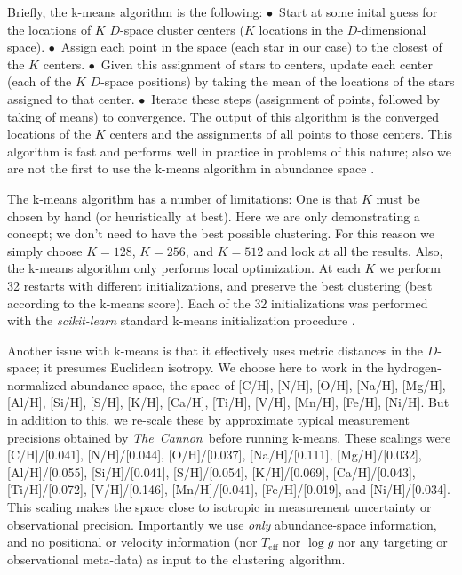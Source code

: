 \documentclass[12pt, letterpaper, preprint]{aastex}
\newcommand{\project}[1]{\textsl{#1}}
\newcommand{\thecannon}{\project{The~Cannon}}
\newcommand{\teff}{T_{\mathrm{eff}}}
\newcommand{\logg}{\log g}
\begin{document}
Briefly, the k-means algorithm is the following:
$\bullet$~Start at some inital guess for the locations of $K$ $D$-space cluster centers ($K$
locations in the $D$-dimensional space).
$\bullet$~Assign each point in the
space (each star in our case) to the closest of the $K$ centers.
$\bullet$~Given this assignment of stars to centers, update each center (each of
the $K$ $D$-space positions) by taking the mean of the locations of
the stars assigned to that center.
$\bullet$~Iterate these steps (assignment of points, followed by taking of means) to convergence.
The output of this algorithm is the converged locations of the $K$ centers and the assignments of
all points to those centers.
This algorithm is fast and performs well in practice in problems of
this nature; also we are not the first to use the k-means algorithm in
abundance space \citep{gratton}.

The k-means algorithm has a number of limitations:
One is that $K$ must be chosen by hand (or heuristically at best).
Here we are only demonstrating a concept; we don't need to have the
best possible clustering.
For this reason we simply choose $K=128$, $K=256$, and $K=512$ and look at all the
results.
Also, the k-means algorithm only performs local optimization.
At each $K$ we perform 32 restarts with different initializations, and
preserve the best clustering (best according to the k-means score).
Each of the 32 initializations was performed with the
\project{scikit-learn} standard k-means initialization procedure
\citep{sklearn}.

Another issue with k-means is that it effectively uses metric
distances in the $D$-space; it presumes Euclidean isotropy.
We choose here to work in the hydrogen-normalized abundance space, the
space of [C/H], [N/H], [O/H], [Na/H], [Mg/H], [Al/H], [Si/H], [S/H],
[K/H], [Ca/H], [Ti/H], [V/H], [Mn/H], [Fe/H], [Ni/H].
But in addition to this, we re-scale these by approximate typical measurement
precisions obtained by \thecannon\ before running k-means.
These scalings were
  [C/H]/[0.041],
  [N/H]/[0.044],
  [O/H]/[0.037],
  [Na/H]/[0.111],
  [Mg/H]/[0.032],
  [Al/H]/[0.055],
  [Si/H]/[0.041],
  [S/H]/[0.054],
  [K/H]/[0.069],
  [Ca/H]/[0.043],
  [Ti/H]/[0.072],
  [V/H]/[0.146],
  [Mn/H]/[0.041],
  [Fe/H]/[0.019], and
  [Ni/H]/[0.034].
This scaling makes the space close to isotropic in measurement uncertainty or
observational precision.
Importantly we use \emph{only} abundance-space information, and no
positional or velocity information (nor $\teff$ nor $\logg$ nor any
targeting or observational meta-data) as input to the clustering
algorithm.
\end{document}
